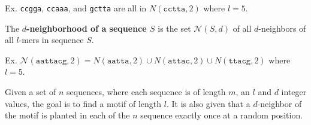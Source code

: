 \noindent \hspace*{35pt} Ex. \texttt{ccgga}, \texttt{ccaaa}, and \texttt{gctta} are all in $N(\texttt{cctta}, 2)$ where $l = 5$. \newline

 \newline
\noindent The \textbf{\boldmath $d$-neighborhood of a sequence $S$} is the set {\boldmath $\mathcal{N}(S, d)$} of all $d$-neighbors of all $l$-mers in sequence $S$. 
	
\noindent \hspace*{35pt} Ex. {\small $\mathcal{N}(\texttt{aattacg}, 2) = N(\texttt{aatta}, 2) \cup N(\texttt{attac}, 2) \cup N(\texttt{ttacg}, 2)$} \newline
\noindent \hspace*{55pt} where $l = 5$. \newline

 \newline
\noindent Given a set of $n$ sequences, where each sequence is of length $m$, an $l$ and $d$ integer values, the goal is to find a motif of length $l$. It is also given that a $d$-neighbor of the motif is planted in each of the $n$ sequence exactly once at a random position.
